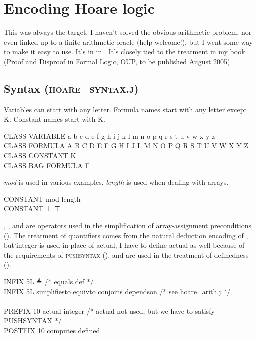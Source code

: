\chapter{Encoding Hoare logic}
\label{chap:Hoare}

This was always the target. I haven't solved the obvious arithmetic problem, nor even linked up to a finite arithmetic oracle (help welcome!), but I went some way to make it easy to use. It's in  in . It's closely tied to the treatment in my book (Proof and Disproof in Formal Logic, OUP, to be published August 2005).

\section{Syntax (\textsc{hoare\_syntax.j})}

Variables can start with any letter. Formula names start with any letter except K. Constant names start with K.
\begin{japeish}
CLASS VARIABLE a b c d e f g h i j k l m n o p q r s t u v w x y z  \\
CLASS FORMULA A B C D E F G H I J L M N O P Q R S T U V W X Y Z \\
CLASS CONSTANT K \\
CLASS BAG FORMULA Γ 
\end{japeish}

\textit{mod} is used in various examples. \textit{length} is used when dealing with arrays.
\begin{japeish}
CONSTANT mod length \\
CONSTANT ⊥ ⊤
\end{japeish}

, ,  and  are operators used in the simplification of array-assignment preconditions (). The treatment of quantifiers comes from the natural deduction encoding of , but`integer is used in place of actual; I have to define actual as well because of the requirements of \textsc{pushsyntax} ().  and  are used in the treatment of definedness ().
\begin{japeish}
INFIX   5L  ≜ /* equals def */ \\
INFIX   5L  simplifiesto equivto conjoins dependson /* see hoare\_arith.j */ \\
 \\
PREFIX  10  actual integer /* actual not used, but we have to satisfy PUSHSYNTAX */ \\
POSTFIX 10  computes defined \\
\end{japeish}
 
